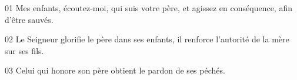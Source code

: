 01 Mes enfants, écoutez-moi, qui suis votre père, et agissez en conséquence, afin d’être sauvés.

02 Le Seigneur glorifie le père dans ses enfants, il renforce l’autorité de la mère sur ses fils.

03 Celui qui honore son père obtient le pardon de ses péchés.


